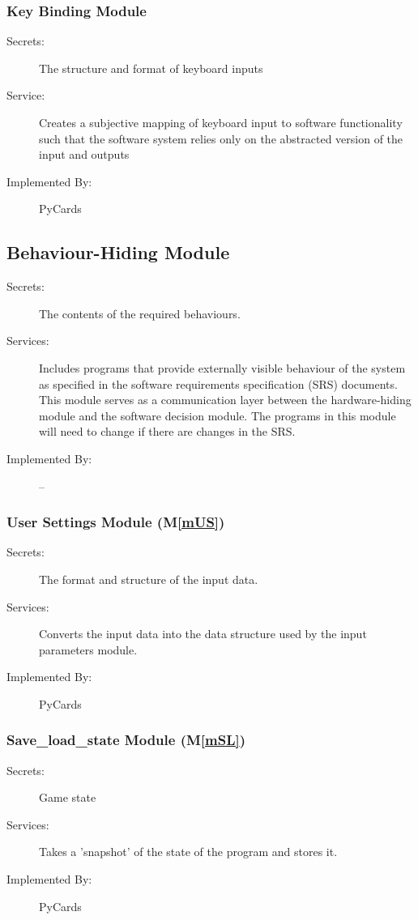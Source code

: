 \documentclass[12pt, titlepage]{article}
\newcommand{\mref}[1]{M\ref{#1}}
\begin{document}
	\subsubsection{Key Binding Module}
	\begin{description}
		\item[Secrets:]The structure and format of keyboard inputs
		\item[Service:]Creates a subjective mapping of keyboard input to 
		software functionality such that the software system relies only on the 
		abstracted version of the input and outputs
		\item[Implemented By:] PyCards
	\end{description}
	\subsection{Behaviour-Hiding Module}
	\begin{description}
		\item[Secrets:]The contents of the required behaviours.
		\item[Services:]Includes programs that provide externally visible 
		behaviour of the system as specified in the software requirements 
		specification (SRS) documents. This module serves as a communication 
		layer between the hardware-hiding module and the software decision 
		module. The programs in this module will need to change if there are 
		changes in the SRS.
		\item[Implemented By:] --
	\end{description}
	\subsubsection{User Settings Module (\mref{mUS})}
	\begin{description}
		\item[Secrets:]The format and structure of the input data.
		\item[Services:]Converts the input data into the data structure used by 
		the input parameters module.
		\item[Implemented By:] PyCards
	\end{description}
	\subsubsection{Save\_load\_state Module (\mref{mSL})}
	\begin{description}
		\item[Secrets:]Game state
		\item[Services:]Takes a 'snapshot' of the state of the program and 
		stores it.
		\item[Implemented By:] PyCards
	\end{description}
\end{document}
